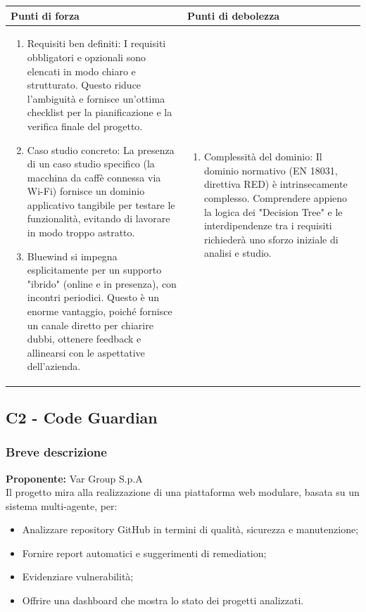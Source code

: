 \documentclass[a4paper,11pt]{article}
\begin{document}
{\footnotesize
\begin{tabularx}{\textwidth}{|X|X|}
\hline
\rowcolor{lightgray!40} %
\textbf{Punti di forza} & \textbf{Punti di debolezza} \\
\hline
\begin{enumerate}
\item Requisiti ben definiti: I requisiti obbligatori e opzionali sono elencati in modo chiaro e strutturato. Questo riduce l'ambiguità e fornisce un'ottima checklist per la pianificazione e la verifica finale del progetto.
\item Caso studio concreto: La presenza di un caso studio specifico (la macchina da caffè connessa via Wi-Fi) fornisce un dominio applicativo tangibile per testare le funzionalità, evitando di lavorare in modo troppo astratto.

\item Bluewind si impegna esplicitamente per un supporto "ibrido" (online e in presenza), con incontri periodici. Questo è un enorme vantaggio, poiché fornisce un canale diretto per chiarire dubbi, ottenere feedback e allinearsi con le aspettative dell'azienda.

\end{enumerate}
 & \begin{enumerate}
\item Complessità del dominio: Il dominio normativo (EN 18031, direttiva RED) è intrinsecamente complesso. Comprendere appieno la logica dei "Decision Tree" e le interdipendenze tra i requisiti richiederà uno sforzo iniziale di analisi e studio.
\end{enumerate} \\
\hline
\end{tabularx}
}

\subsection{C2 - Code Guardian}
\subsubsection{Breve descrizione}
\textbf{Proponente:} Var Group S.p.A
\vspace{0.5em}\\
Il progetto mira alla realizzazione di una piattaforma web modulare, basata su un sistema multi-agente, per:

\begin{itemize}[leftmargin=*]
  \item Analizzare repository GitHub in termini di qualità, sicurezza e manutenzione;
  \item Fornire report automatici e suggerimenti di remediation;
  \item Evidenziare vulnerabilità;
  \item Offrire una dashboard che mostra lo stato dei progetti analizzati.
\end{itemize}
\end{document}
